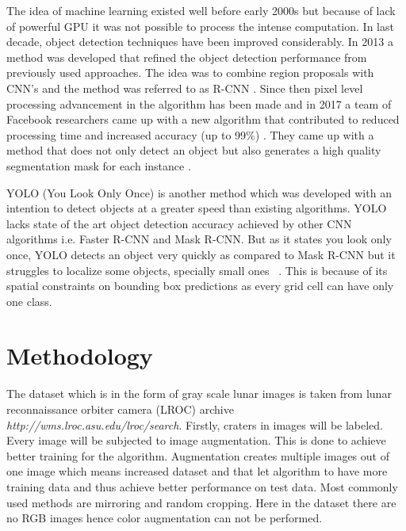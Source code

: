 \documentclass[11pt]{article}
\begin{document}
The idea of machine learning existed well before early 2000s but because of lack of powerful GPU it was not possible to process the intense computation. In last decade, object detection techniques have been improved considerably. In 2013 a method was developed that refined the object detection performance from previously used approaches. The idea was to combine region proposals with CNN's and the method was referred to as R-CNN \cite{girshick_rich_2013}. Since then pixel level processing advancement in the algorithm has been made and in 2017 a team of Facebook researchers came up with a new algorithm that contributed to reduced processing time and increased accuracy (up to 99\%) \cite{he_mask_2017}. They came up with a method that does not only detect an object but also generates a high quality segmentation mask for each instance \cite{he_mask_2017}. 

\par
YOLO (You Look Only Once) is another method which was developed with an intention to detect objects at a greater speed than existing algorithms. YOLO lacks state of the art object detection accuracy achieved by other CNN algorithms i.e. Faster R-CNN and Mask R-CNN. But as it states you look only once, YOLO detects an object very quickly as compared to Mask R-CNN but it struggles to localize some objects, specially small ones ~\cite{redmon_you_2016}. This is because of its spatial constraints on bounding box predictions as every grid cell can have only one class.



\section{Methodology}
The dataset which is in the form of gray scale lunar images is taken from lunar reconnaissance orbiter camera (LROC) archive \textit{http://wms.lroc.asu.edu/lroc/search}. Firstly, craters in images will be labeled. Every image will be subjected to image augmentation. This is done to achieve better training for the algorithm. Augmentation creates multiple images out of one image which means increased dataset and that let algorithm to have more training data and thus achieve better performance on test data. Most commonly used methods are mirroring and random cropping. Here in the dataset there are no RGB images hence color augmentation can not be performed.
\end{document}
